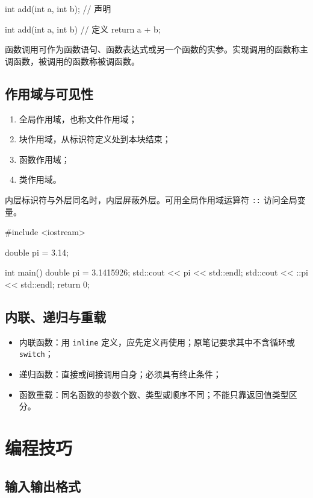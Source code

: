 \documentclass[UTF8,fontset=fandol,zihao=5]{ctexart}
\newcommand{\code}[1]{\texttt{#1}}
\begin{document}
\begin{cppcode}[函数]
int add(int a, int b);      // 声明

int add(int a, int b) {     // 定义
    return a + b;
}
\end{cppcode}

函数调用可作为函数语句、函数表达式或另一个函数的实参。实现调用的函数称主调函数，被调用的函数称被调函数。

\subsection{作用域与可见性}

\begin{enumerate}
  \item 全局作用域，也称文件作用域；
  \item 块作用域，从标识符定义处到本块结束；
  \item 函数作用域；
  \item 类作用域。
\end{enumerate}

内层标识符与外层同名时，内层屏蔽外层。可用全局作用域运算符 \code{::} 访问全局变量。

\begin{cppcode}[全局作用域运算符]
#include <iostream>

double pi = 3.14;

int main() {
    double pi = 3.1415926;
    std::cout << pi << std::endl;
    std::cout << ::pi << std::endl;
    return 0;
}
\end{cppcode}

\subsection{内联、递归与重载}

\begin{itemize}
  \item 内联函数：用 \code{inline} 定义，应先定义再使用；原笔记要求其中不含循环或 \code{switch}；
  \item 递归函数：直接或间接调用自身；必须具有终止条件；
  \item 函数重载：同名函数的参数个数、类型或顺序不同；不能只靠返回值类型区分。
\end{itemize}

\section{编程技巧}

\subsection{输入输出格式}
\end{document}
